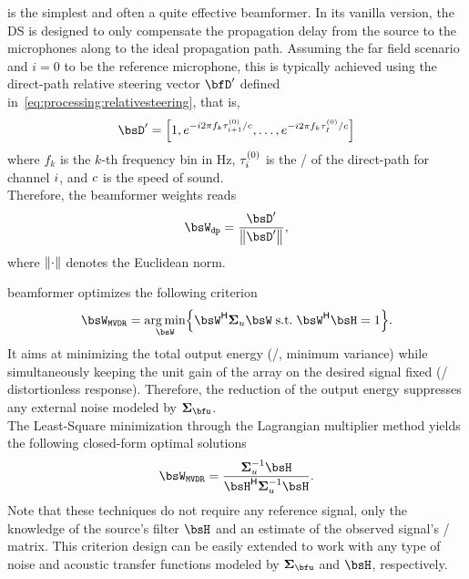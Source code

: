  is the simplest and often a quite effective beamformer.
In its vanilla version, the \ac{DS} is designed to only compensate the propagation delay from the source to the microphones along to the ideal propagation path.
Assuming the far field scenario and $i=0$ to be the reference microphone, this is typically achieved using the direct-path relative steering vector $\bfD'$ defined in~\cref{eq:processing:relativesteering}, that is,
\begin{equation}
    \bsD' = \klist{
                1,
                \cste^{-\csti 2 \pi f_k \tau_{\idxMic+1}^{(0)} / \speedOfSound},
                \ldots,
                \cste^{-\csti 2 \pi f_k \tau_{\numMics}^{(0)} / \speedOfSound}
        }
\end{equation}
where $f_k$ is the $k$-th frequency bin in Hz, $\tau_{i}^{(0)}$ is the \TOA/ of the direct-path for channel $i$, and $c$ is the speed of sound.
\\Therefore, the beamformer weights reads
\begin{equation}
    \bsW_{\mathtt{dp}} = \frac{\bsD'}{\kvvbar{\bsD'}},
\end{equation}
where $\kvvbar{\cdot}$ denotes the Euclidean norm.

 beamformer optimizes the following criterion
\begin{equation}
    \bsW_{\MVDR} = \kargmin_{\bsW} \kbrace{ \khermitian{\bsW} \xpsd_u \bsW\;\text{s.t.}\;\khermitian{\bsW} \FLTS = 1}
    .
\end{equation}
It aims at minimizing the total output energy (\ie/, minimum variance) while simultaneously keeping the unit gain of the array on the desired signal fixed (\ie/ distortionless response).
Therefore, the reduction of the output energy suppresses any external noise modeled by $\xpsd_{\bfu}$.
\\The Least-Square minimization through the Lagrangian multiplier method yields the following closed-form optimal solutions
\begin{equation}\label{eq:dechorateapp:mvdr}
    \bsW_{\MVDR} = \frac{\kinv{\xpsd}_{u} \FLTS}
                                {\khermitian{\FLTS} \kinv{\xpsd}_{u} \FLTS}
    .
\end{equation}
Note that these techniques do not require any reference signal, only the knowledge of the source's filter $\FLTS$  and an estimate of the observed signal's \PSD/ matrix.
This criterion design can be easily extended to work with any type of noise and acoustic transfer functions modeled by $\xpsd_{\bfu}$ and $\FLTS$, respectively.

